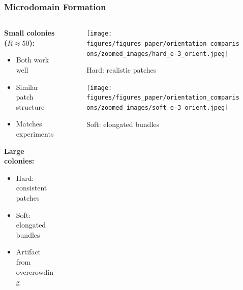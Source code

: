 \documentclass[10pt,t]{beamer}
\begin{document}
\begin{frame}
    \frametitle{Microdomain Formation}

    \begin{columns}
        \begin{column}{0.5\textwidth}

            \textbf{Small colonies ($R \approx 50$):}
            \begin{itemize}
                \item Both work well
                \item Similar patch structure
                \item Matches experiments
            \end{itemize}

            \vspace{0.5cm}

            \textbf{Large colonies:}
            \begin{itemize}
                \item Hard: consistent patches
                \item Soft: elongated bundles
                \item Artifact from overcrowding
            \end{itemize}
        \end{column}

        \begin{column}{0.5\textwidth}
            \vspace{-2.3cm}
            \begin{figure}
                \centering
                \texttt{[image: figures/figures\_paper/orientation\_comparisons/zoomed\_images/hard\_e-3\_orient.jpeg]}
                \caption*{\scriptsize{Hard: realistic patches}}
            \end{figure}
            \vspace{-0.7cm}
            \begin{figure}
                \centering
                \texttt{[image: figures/figures\_paper/orientation\_comparisons/zoomed\_images/soft\_e-3\_orient.jpeg]}
                \caption*{\scriptsize{Soft: elongated bundles}}
            \end{figure}
        \end{column}
    \end{columns}

\end{frame}


\end{document}
